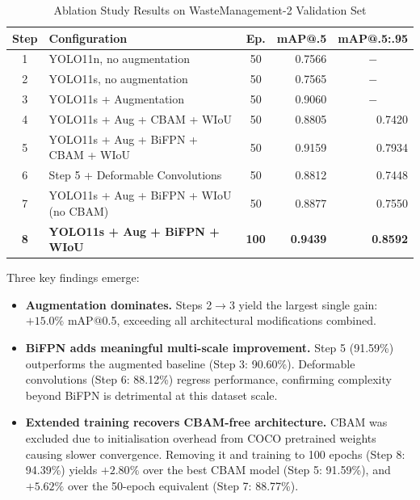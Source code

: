 \documentclass[runningheads]{llncs}
\begin{document}
\begin{table}[H]
\centering
\caption{Ablation Study Results on WasteManagement-2 Validation Set}
\label{tab:ablation}
\setlength{\tabcolsep}{5pt}
\renewcommand{\arraystretch}{1.1}
\begin{tabular}{c p{6.2cm} c r r}
\toprule
\textbf{Step} & \textbf{Configuration} & \textbf{Ep.} &
\textbf{mAP@.5} & \textbf{mAP@.5:.95} \\
\midrule
1 & YOLO11n, no augmentation          & 50  & 0.7566 & \multicolumn{1}{c}{$-$} \\
2 & YOLO11s, no augmentation          & 50  & 0.7565 & \multicolumn{1}{c}{$-$} \\
3 & YOLO11s + Augmentation            & 50  & 0.9060 & \multicolumn{1}{c}{$-$} \\
4 & YOLO11s + Aug + CBAM + WIoU       & 50  & 0.8805 & 0.7420 \\
5 & YOLO11s + Aug + BiFPN + CBAM + WIoU & 50 & 0.9159 & 0.7934 \\
6 & Step 5 + Deformable Convolutions  & 50  & 0.8812 & 0.7448 \\
\midrule
7 & YOLO11s + Aug + BiFPN + WIoU (no CBAM) & 50  & 0.8877 & 0.7550 \\
\textbf{8} & \textbf{YOLO11s + Aug + BiFPN + WIoU} & \textbf{100} &
\textbf{0.9439} & \textbf{0.8592} \\
\bottomrule
\end{tabular}
\end{table}

\noindent Three key findings emerge:

\begin{itemize}
  \item \textbf{Augmentation dominates.} Steps 2$\to$3 yield the
        largest single gain: $+15.0\%$ mAP@0.5, exceeding all
        architectural modifications combined.

  \item \textbf{BiFPN adds meaningful multi-scale improvement.}
        Step 5 (91.59\%) outperforms the augmented baseline
        (Step 3: 90.60\%). Deformable convolutions (Step 6: 88.12\%)
        regress performance, confirming complexity beyond BiFPN
        is detrimental at this dataset scale.

  \item \textbf{Extended training recovers CBAM-free architecture.}
        CBAM was excluded due to initialisation overhead from COCO
        pretrained weights causing slower convergence. Removing it
        and training to 100 epochs (Step 8: 94.39\%) yields
        $+2.80\%$ over the best CBAM model (Step 5: 91.59\%),
        and $+5.62\%$ over the 50-epoch equivalent (Step 7: 88.77\%).
\end{itemize}
\end{document}
